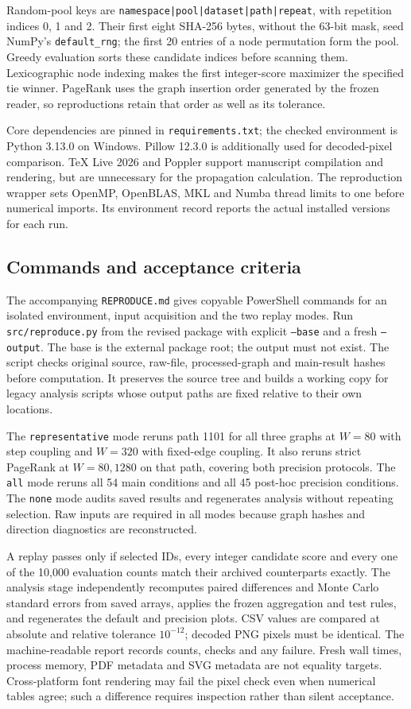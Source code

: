 \documentclass[smallextended]{svjour3}
\begin{document}
Random-pool keys are \texttt{namespace|pool|dataset|path|repeat}, with repetition
indices 0, 1 and 2. Their first eight SHA-256 bytes, without the 63-bit mask,
seed NumPy's \texttt{default\_rng}; the first 20 entries of a node permutation
form the pool. Greedy evaluation sorts these candidate indices before scanning
them. Lexicographic node indexing makes the first integer-score maximizer the
specified tie winner. PageRank uses the graph insertion order generated by
the frozen reader, so reproductions retain that order as well as its tolerance.

Core dependencies are pinned in \texttt{requirements.txt}; the checked environment
is Python 3.13.0 on Windows. Pillow 12.3.0 is additionally used for decoded-pixel
comparison. TeX Live 2026 and Poppler support manuscript compilation and rendering,
but are unnecessary for the propagation calculation. The reproduction wrapper
sets OpenMP, OpenBLAS, MKL and Numba thread limits to one before numerical imports.
Its environment record reports the actual installed versions for each run.

\subsection{Commands and acceptance criteria}
The accompanying \texttt{REPRODUCE.md} gives copyable PowerShell commands for
an isolated environment, input acquisition and the two replay modes. Run
\texttt{src/reproduce.py} from the revised package with explicit
\texttt{--base} and a fresh \texttt{--output}. The base is the external package
root; the output must not exist. The script checks original source, raw-file,
processed-graph and main-result hashes before computation. It preserves the
source tree and builds a working copy for legacy analysis scripts whose output
paths are fixed relative to their own locations.

The \texttt{representative} mode reruns path 1101 for all three graphs at
$W=80$ with step coupling and $W=320$ with fixed-edge coupling. It also reruns
strict PageRank at $W=80,1280$ on that path, covering both precision protocols.
The \texttt{all} mode reruns all 54 main conditions and all 45 post-hoc
precision conditions. The \texttt{none} mode audits saved results and regenerates
analysis without repeating selection. Raw inputs are required in all modes
because graph hashes and direction diagnostics are reconstructed.

A replay passes only if selected IDs, every integer candidate score and every
one of the 10,000 evaluation counts match their archived counterparts exactly.
The analysis stage independently recomputes paired differences and Monte Carlo
standard errors from saved arrays, applies the frozen aggregation and test rules,
and regenerates the default and precision plots. CSV values are compared at
absolute and relative tolerance $10^{-12}$; decoded PNG pixels must be identical.
The machine-readable report records counts, checks and any failure. Fresh wall
times, process memory, PDF metadata and SVG metadata are not equality targets.
Cross-platform font rendering may fail the pixel check even when numerical
tables agree; such a difference requires inspection rather than silent acceptance.
\end{document}
